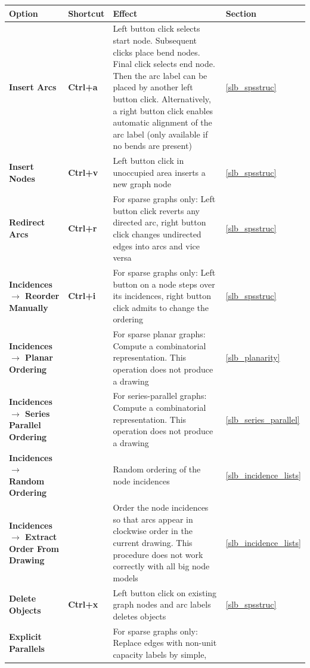 \documentclass[a4paper,11pt,twoside]{book}
\begin{document}
\begin{tabular}{p{7.5cm}|p{2cm}|p{13.5cm}|p{1.5cm}} 
\large\bf Option &  \large\bf Shortcut & \large\bf Effect & \large\bf Section \\
[1mm] \hline \hline
\bf Insert Arcs & \bf Ctrl+a &
    Left button click selects start node. Subsequent clicks place bend nodes.
    Final click selects end node. Then the arc label can be placed by another
    left button click. Alternatively, a right button click enables automatic
    alignment of the arc label (only available if no bends are present) &
    \ref{slb_spsstruc} \\ \hline
\bf Insert Nodes&\bf Ctrl+v &
    Left button click in unoccupied area inserts a new graph node &
    \ref{slb_spsstruc} \\ \hline
\bf Redirect Arcs&\bf Ctrl+r &
    For sparse graphs only: Left button click reverts any directed arc, right
    button click changes undirected edges into arcs and vice versa &
    \ref{slb_spsstruc} \\ \hline
\bf Incidences $\rightarrow$ Reorder Manually &\bf Ctrl+i &
    For sparse graphs only: Left button on a node steps over its incidences,
    right button click admits to change the ordering &
    \ref{slb_spsstruc} \\ \hline
\bf Incidences $\rightarrow$ Planar Ordering & &
    For sparse planar graphs: Compute a combinatorial representation. This
    operation does not produce a drawing &
    \ref{slb_planarity} \\ \hline
\bf Incidences $\rightarrow$ Series Parallel Ordering & &
    For series-parallel graphs: Compute a combinatorial representation. This
    operation does not produce a drawing &
    \ref{slb_series_parallel} \\ \hline
\bf Incidences $\rightarrow$ Random Ordering & &
    Random ordering of the node incidences &
    \ref{slb_incidence_lists} \\ \hline
\bf Incidences $\rightarrow$ Extract Order From Drawing & &
    Order the node incidences so that arcs appear in clockwise order in the
    current drawing. This procedure does not work correctly with all big node
    models &
    \ref{slb_incidence_lists} \\ \hline
\bf Delete Objects&\bf Ctrl+x &
    Left button click on existing graph nodes and arc labels deletes objects &
    \ref{slb_spsstruc} \\ \hline
\bf Explicit Parallels & &
    For sparse graphs only: Replace edges with non-unit capacity labels by simple,

\end{tabular}
\end{document}
